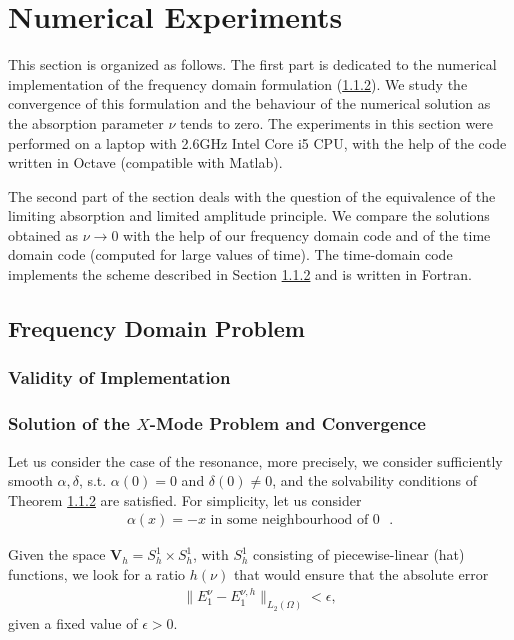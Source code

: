 \documentclass[proc]{edpsmath}
\begin{document}
\section{Numerical Experiments}
This section is organized as follows. The first part is dedicated to the numerical implementation
of the frequency domain formulation (\ref{}). We study the convergence of this formulation and the behaviour 
of the numerical solution as the absorption parameter $\nu$ tends to zero. The experiments in this section were 
performed on a laptop with 2.6GHz Intel Core i5 CPU, with the help of the code written in Octave (compatible with Matlab). 

The second part of the section deals with the question of the equivalence of the limiting absorption and limited amplitude 
principle. We compare the solutions obtained as $\nu\rightarrow 0$ with the help of our frequency domain code 
and of the time domain code (computed for large values of time). 
The time-domain code implements the scheme described in Section \ref{} and 
is written in Fortran. 
\subsection{Frequency Domain Problem}
\subsubsection{Validity of Implementation}

\subsubsection{Solution of the $X$-Mode Problem and Convergence}

Let us consider the case of the resonance, more precisely, we consider sufficiently smooth
$\alpha,\delta$, s.t. $\alpha(0)=0$ and $\delta(0)\neq 0$, and the solvability conditions 
of Theorem \ref{}  are satisfied. 
For simplicity, let us consider 
\begin{align}
\label{eq:cond}
 \alpha(x)=-x \text{  in some neighbourhood of $0$ }.
\end{align}


Given the space $\mathbf{V}_{h}=S_{h}^{1}\times S_{h}^{1}$, with $S_{h}^{1}$ consisting of piecewise-linear (hat) functions, we look for a ratio $h(\nu)$ that would ensure that the absolute error 
\begin{align}
\label{eq:problem1}
\|E^{\nu}_{1}-E^{\nu,h}_{1}\|_{L_{2}(\Omega)}<\epsilon,
\end{align}
given a fixed value of $\epsilon>0$. 
\end{document}
